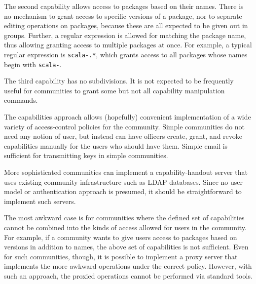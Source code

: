 \documentclass{article}
\begin{document}
The second capability allows access to packages based on their names.
There is no mechanism to grant access to specific versions of a
package, nor to separate editing operations on packages, because these
are all expected to be given out in groups.  Further, a regular
expression is allowed for matching the package name, thus allowing
granting access to multiple packages at once.  For example, a typical
regular expression is \texttt{scala-.*}, which grants access to all
packages whose names begin with \texttt{scala-}.

The third capability has no subdivisions.  It is not expected to be
frequently useful for communities to grant some but not all capability
manipulation commands.

The capabilities approach allows (hopefully) convenient implementation
of a wide variety of access-control policies for the community.
Simple communities do not need any notion of user, but instead can
have officers create, grant, and revoke capabilities manually for the
users who should have them.  Simple email is sufficient for
transmitting keys in simple communities.

More sophisticated communities can implement a capability-handout
server that uses existing community infrastructure such as LDAP
databases.  Since no user model or authentication approach is
presumed, it should be straightforward to implement such servers.

The most awkward case is for communities where the defined set of
capabilities cannot be combined into the kinds of access allowed for
users in the community.  For example, if a community wants to give
users access to packages based on versions in addition to names, the
above set of capabilities is not sufficient.  Even for such
communities, though, it is possible to implement a proxy server that
implements the more awkward operations under the correct policy.
However, with such an approach, the proxied operations cannot be
performed via standard tools.
\end{document}
